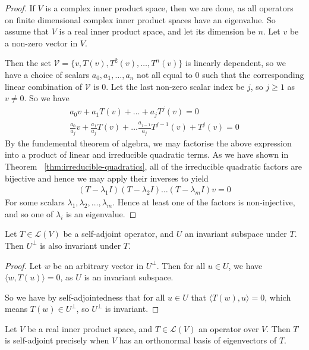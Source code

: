\documentclass[]{article}
\begin{document}
\begin{proof}
		If $V$ is a complex inner product space, then we are done, as all operators on finite dimensional complex inner product spaces have an eigenvalue. So assume that $V$ is a real inner product space, and let its dimension be $n$. Let $v$ be a non-zero vector in $V$.

		Then the set $\mathcal{V} = \{v, T(v), T^2(v), \ldots, T^n(v)\}$ is linearly dependent, so we have a choice of scalars $a_0, a_1, \ldots, a_n$ not all equal to $0$ such that the corresponding linear combination of $\mathcal{V}$ is $0$. Let the last non-zero scalar index be $j$, so $j \geq 1$ as $v \neq 0$. So we have
		\begin{align*}
				a_0 v + a_1 T(v) + \ldots + a_j T^j(v) = 0 \\
				\frac{a_0}{a_j} v + \frac{a_1}{a_j} T(v) + \ldots \frac{a_{j-1}}{a_j}T^{j-1}(v)+ T^j(v) = 0 
		\end{align*}
		By the fundemental theorem of algebra, we may factorise the above expression into a product of linear and irreducible quadratic terms. As we have shown in Theorem ~\ref{thm:irreducible-quadratics}, all of the irreducible quadratic factors are bijective and hence we may apply their inverses to yield
		\begin{align*}
				(T - \lambda_1 I)(T - \lambda_2 I) \ldots (T - \lambda_m I) v = 0
		\end{align*}
		For some scalars $\lambda_1, \lambda_2, \ldots, \lambda_m$. Hence at least one of the factors is non-injective, and so one of $\lambda_i$ is an eigenvalue.
\end{proof}

\begin{thm}
		Let $T \in \mathcal{L}(V)$ be a self-adjoint operator, and $U$ an invariant subspace under $T$. Then $U^{\perp}$ is also invariant under $T$.
\end{thm}

\begin{proof}
		Let $w$ be an arbitrary vector in $U^{\perp}$. Then for all $u \in U$, we have $\langle w, T(u) \rangle = 0$, as $U$ is an invariant subspace. 

		So we have by self-adjointedness that for all $u \in U$ that $\langle T(w), u \rangle = 0$, which means $T(w) \in U^{\perp}$, so $U^{\perp}$ is invariant.
\end{proof}

\begin{thm} 
		Let $V$ be a real inner product space, and $T \in \mathcal{L}(V)$ an operator over $V$. Then $T$ is self-adjoint precisely when $V$ has an orthonormal basis of eigenvectors of $T$.
\end{thm}
\end{document}
